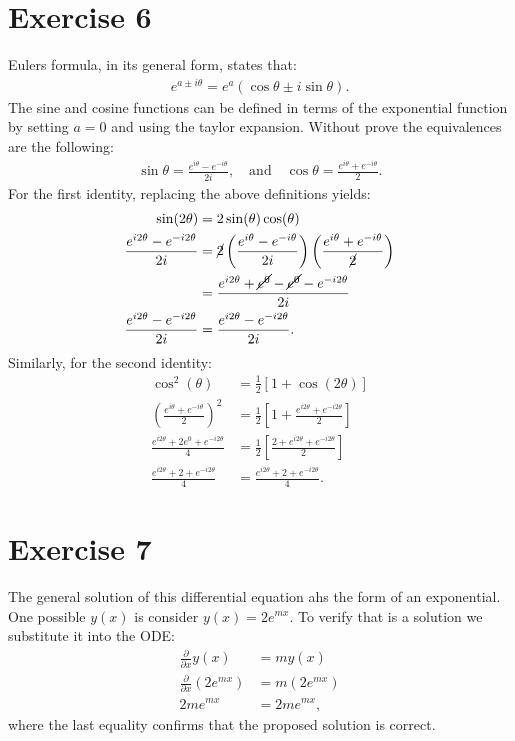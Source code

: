 \documentclass[letterpaper,11pt,twoside]{article}
\begin{document}
\section{Exercise 6}
Eulers formula, in its general form, states that:
\begin{align}
  e^{a\pm i\theta}=e^{a}(\cos\theta\pm i\sin\theta).
\end{align}
The sine and cosine functions can be defined in terms of the exponential function by setting $a=0$ and using the taylor expansion.
Without prove the equivalences are the following:
\begin{align*}
  \sin\theta=\frac{e^{i\theta}-e^{-i\theta}}{2i},\quad\text{and}\quad\cos\theta=\frac{e^{i\theta}+e^{-i\theta}}{2}.
\end{align*}
For the first identity, replacing the above definitions yields:
\begin{align*}
  \sin(2\theta)&=2\sin(\theta)\cos(\theta)\\
  \frac{e^{i2\theta}-e^{-i2\theta}}{2i}&=\cancel{2}\left(\frac{e^{i\theta}-e^{-i\theta}}{2i}\right)\left(\frac{e^{i\theta}+e^{-i\theta}}{\cancel{2}}\right)\\
  &=\frac{e^{i2\theta}+\cancel{e^0}-\cancel{e^{0}}-e^{-i2\theta}}{2i}\\
  \frac{e^{i2\theta}-e^{-i2\theta}}{2i}&=\frac{e^{i2\theta}-e^{-i2\theta}}{2i}.
\end{align*}
Similarly, for the second identity:
\begin{align*}
  \cos^2(\theta)&=\frac{1}{2}[1+\cos(2\theta)]\\
  \left(\frac{e^{i\theta}+e^{-i\theta}}{2}\right)^2&=\frac{1}{2}\left[1+\frac{e^{i2\theta}+e^{-i2\theta}}{2}\right]\\
  \frac{e^{i2\theta}+2e^{0}+e^{-i2\theta}}{4}&=\frac{1}{2}\left[\frac{2+e^{i2\theta}+e^{-i2\theta}}{2}\right]\\
  \frac{e^{i2\theta}+2+e^{-i2\theta}}{4}&=\frac{e^{i2\theta}+2+e^{-i2\theta}}{4}.
\end{align*}
\section{Exercise 7}
The general solution of this differential equation ahs the form of an exponential. One possible $y(x)$ is consider $y(x)=2e^{mx}$. To verify that is a solution we 
substitute it into the ODE:
\begin{align*}
  \frac{\partial}{\partial x}y(x)&=my(x)\\
  \frac{\partial}{\partial x}(2e^{mx})&=m(2e^{mx})\\
  2me^{mx}&=2me^{mx},
\end{align*}
where the last equality confirms that the proposed solution is correct.
\end{document}

